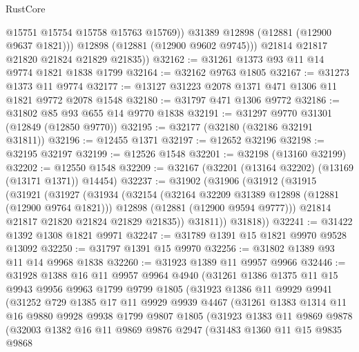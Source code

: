 \begin{lexlean}{RustCore}
\begin{coremodule}
                @15751
                @15754
                @15758
                @15763
                @15769))
            @31389
            @12898
            (@12881 (@12900 @9637 @1821)))
          @12898
          (@12881 (@12900 @9602 @9745)))
        @21814
        @21817
        @21820
        @21824
        @21829
        @21835))
@32162 := @31261 @1373 @93 @11 @14 @9774 @1821 @1838 @1799
@32164 := @32162 @9763 @1805
@32167 := @31273 @1373 @11 @9774
@32177 := @13127 @31223 @2078 @1371 @471 @1306 @11 @1821 @9772 @2078 @1548
@32180 := @31797 @471 @1306 @9772
@32186 := @31802 @85 @93 @655 @14 @9770 @1838
@32191 := @31297 @9770 @31301 (@12849 (@12850 @9770))
@32195 := @32177 (@32180 (@32186 @32191 @31811))
@32196 := @12455 @1371
@32197 := @12652 @32196
@32198 := @32195 @32197
@32199 := @12526 @1548
@32201 := @32198 (@13160 @32199)
@32202 := @12550 @1548
@32209 := @32167 (@32201 (@13164 @32202) (@13169 (@13171 @1371)) @14454)
@32237 := @31902
    (@31906
      (@31912
        (@31915
          (@31921
            (@31927
              (@31934
                (@32154
                  (@32164 @32209 @31389 @12898 (@12881 (@12900 @9764 @1821)))
                  @12898
                  (@12881 (@12900 @9594 @9777)))
                @21814
                @21817
                @21820
                @21824
                @21829
                @21835))
            @31811))
        @31818))
@32241 := @31422 @1392 @1308 @1821 @9971
@32247 := @31789 @1391 @15 @1821 @9970 @9528 @13092
@32250 := @31797 @1391 @15 @9970
@32256 := @31802 @1389 @93 @11 @14 @9968 @1838
@32260 := @31923 @1389 @11 @9957 @9966
@32446 := @31928
    @1388
    @16
    @11
    @9957
    @9964
    @4940
    (@31261
      @1386
      @1375
      @11
      @15
      @9943
      @9956
      @9963
      @1799
      @9799
      @1805
      (@31923
        @1386
        @11
        @9929
        @9941
        (@31252
          @729
          @1385
          @17
          @11
          @9929
          @9939
          @4467
          (@31261
            @1383
            @1314
            @11
            @16
            @9880
            @9928
            @9938
            @1799
            @9807
            @1805
            (@31923
              @1383
              @11
              @9869
              @9878
              (@32003
                @1382
                @16
                @11
                @9869
                @9876
                @2947
                (@31483
                  @1360
                  @11
                  @15
                  @9835
                  @9868

\end{coremodule}
\end{lexlean}
